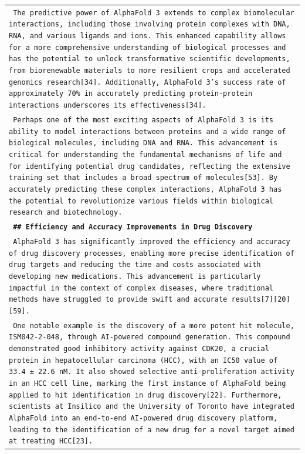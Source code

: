 \documentclass[11pt]{article}
\begin{document}
\begin{longtable}{p{\textwidth}}
\texttt{\small{ The predictive power of AlphaFold 3 extends to complex biomolecular interactions, including those involving protein complexes with DNA, RNA, and various ligands and ions. This enhanced capability allows for a more comprehensive understanding of biological processes and has the potential to unlock transformative scientific developments, from biorenewable materials to more resilient crops and accelerated genomics research[34]. Additionally, AlphaFold 3's success rate of approximately 70\% in accurately predicting protein-protein interactions underscores its effectiveness[34]. }} \\
\texttt{\small{ Perhaps one of the most exciting aspects of AlphaFold 3 is its ability to model interactions between proteins and a wide range of biological molecules, including DNA and RNA. This advancement is critical for understanding the fundamental mechanisms of life and for identifying potential drug candidates, reflecting the extensive training set that includes a broad spectrum of molecules[53]. By accurately predicting these complex interactions, AlphaFold 3 has the potential to revolutionize various fields within biological research and biotechnology. }} \\
\vspace{1pt}
\texttt{\small{\textbf{ \#\# Efficiency and Accuracy Improvements in Drug Discovery }}} \\
\texttt{\small{ AlphaFold 3 has significantly improved the efficiency and accuracy of drug discovery processes, enabling more precise identification of drug targets and reducing the time and costs associated with developing new medications. This advancement is particularly impactful in the context of complex diseases, where traditional methods have struggled to provide swift and accurate results[7][20][59]. }} \\
\texttt{\small{ One notable example is the discovery of a more potent hit molecule, ISM042-2-048, through AI-powered compound generation. This compound demonstrated good inhibitory activity against CDK20, a crucial protein in hepatocellular carcinoma (HCC), with an IC50 value of 33.4 ± 22.6 nM. It also showed selective anti-proliferation activity in an HCC cell line, marking the first instance of AlphaFold being applied to hit identification in drug discovery[22]. Furthermore, scientists at Insilico and the University of Toronto have integrated AlphaFold into an end-to-end AI-powered drug discovery platform, leading to the identification of a new drug for a novel target aimed at treating HCC[23]. }} \\

\end{longtable}
\end{document}
